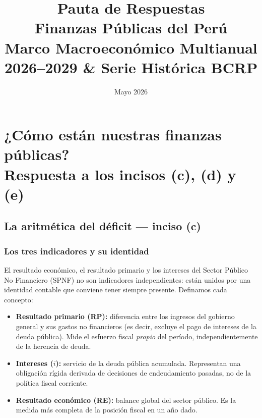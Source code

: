 \documentclass[12pt, a4paper]{article}
\title{\Large\bfseries Pauta de Respuestas\\[6pt]
       \large Finanzas Públicas del Perú\\[4pt]
       \normalsize Marco Macroeconómico Multianual 2026--2029 \&
       Serie Histórica BCRP}
\author{}
\date{\small Mayo 2026}
\newcommand{\emp}[1]{\textbf{#1}}
\begin{document}
\maketitle
\thispagestyle{fancy}

\tableofcontents
\vspace{1cm}

\section{¿Cómo están nuestras finanzas públicas?
         \texorpdfstring{\\[-4pt]}{}\normalsize
         Respuesta a los incisos (c), (d) y (e)}

\subsection{La aritmética del déficit \texorpdfstring{---}{---}
            inciso (c)}

\subsubsection*{Los tres indicadores y su identidad}

El resultado económico, el resultado primario y los intereses del Sector Público
No Financiero (SPNF) no son indicadores independientes: están unidos por una
identidad contable que conviene tener siempre presente.
Definamos cada concepto:

\begin{itemize}[leftmargin=1.5em]
    \item \emp{Resultado primario (RP):} diferencia entre los ingresos del
          gobierno general y sus gastos no financieros (es decir, excluye el
          pago de intereses de la deuda pública). Mide el esfuerzo fiscal
          \emph{propio} del período, independientemente de la herencia de deuda.
    \item \emp{Intereses ($i$):} servicio de la deuda pública acumulada.
          Representan una obligación rígida derivada de decisiones de
          endeudamiento pasadas, no de la política fiscal corriente.
    \item \emp{Resultado económico (RE):} balance global del sector público.
          Es la medida más completa de la posición fiscal en un año dado.
\end{itemize}
\end{document}
